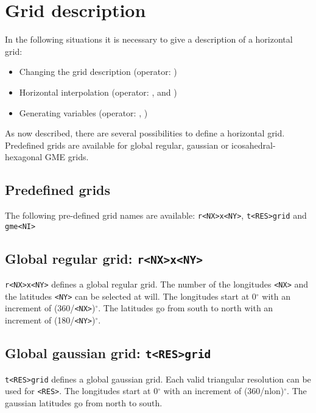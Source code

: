 \section{Grid description}
\label{GRID_DESCRIPTION}

In the following situations it is necessary to give a description of a horizontal grid:

\begin{itemize}
\item Changing the grid description (operator: )
\item Horizontal interpolation (operator: ,  and )
\item Generating variables (operator: , )
\end{itemize}

As now described, there are several possibilities to define a horizontal grid.
Predefined grids are available for global regular, gaussian or icosahedral-hexagonal GME grids.


\subsection{Predefined grids}

The following pre-defined grid names are available: 
{\tt r<NX>x<NY>}, {\tt t<RES>grid} and {\tt gme<NI>}

\subsection*{Global regular grid: {\tt r<NX>x<NY>}}
    {\tt r<NX>x<NY>} defines a global regular grid.
    The number of the longitudes {\tt <NX>} and the latitudes {\tt <NY>}
    can be selected at will.
    The longitudes start at 0$^\circ$ with an increment of (360/{\tt <NX>})$^\circ$.
    The latitudes go from south to north with an increment of (180/{\tt <NY>})$^\circ$.

\subsection*{Global gaussian grid: {\tt t<RES>grid}}
    {\tt t<RES>grid} defines a global gaussian grid.
    Each valid triangular resolution can be used for {\tt <RES>}.
    The longitudes start at 0$^\circ$ with an increment of (360/nlon)$^\circ$.
    The gaussian latitudes go from north to south.

